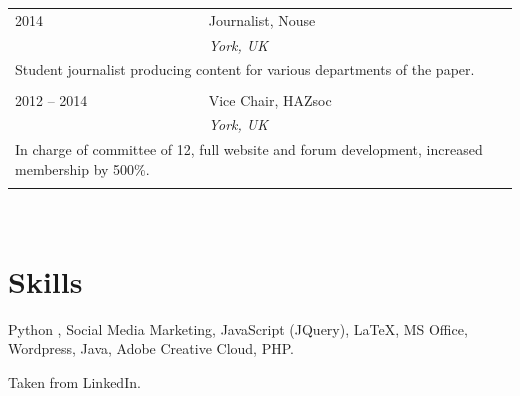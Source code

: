 \documentclass[10pt]{article}
\begin{document}
\begin{minipage}[t]{0.35\textwidth}
\begin{tabularx}{\linewidth}{lX}
2014 & {Journalist, Nouse} \\
& \small{\textit{York, UK}}\\
\multicolumn{2}{p{\linewidth}}{Student journalist producing content for various departments of the paper.} \\
\\

2012 -- 2014 & {Vice Chair, HAZsoc} \\
& \small{\textit{York, UK}}\\
\multicolumn{2}{p{\linewidth}}{In charge of committee of 12, full website and forum development, increased membership by 500\%.} \\
\\

\end{tabularx}\\

\section{Skills}
{\color{headings} Python }, Social Media Marketing, {\color{headings} JavaScript (JQuery)}, \LaTeX, MS Office, Wordpress, {\color{headings} Java}, Adobe Creative Cloud, {\color{headings} PHP}.

{\small{Taken from LinkedIn.}}

\vspace{10pt}

\end{minipage}
\end{document}
